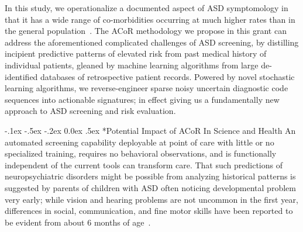 \documentclass[onecolumn, compsoc,11pt]{IEEEtran}
\makeatletter
\renewcommand\paragraph{\@startsection {section}{1}{\z@}%
                                   {-.1ex \@plus -.5ex \@minus -.2ex}%
                                   {0.0ex \@plus.5ex}%
                                   {\fontsize{11}{10}\selectfont\bfseries\itshape\sffamily\color{black}}}
\def\ZERO{ACoR\xspace}
\makeatother
\begin{document}
{\color{Red1}In this study, we operationalize a documented aspect of ASD symptomology in  that it has   a wide range  of co-morbidities occurring at much higher rates than in the general population~\cite{hyman2020identification}.
The \ZERO methodology we propose in this grant can address the aforementioned  complicated  challenges of ASD screening, by distilling incipient predictive patterns of  elevated risk from past medical history of individual  patients, gleaned by machine learning  algorithms from large  de-identified databases of retrospective patient records. Powered by  novel stochastic learning algorithms, we  reverse-engineer sparse noisy uncertain diagnostic code sequences into actionable signatures; in effect giving us  a fundamentally new approach to ASD screening and risk evaluation.}

\paragraph*{Potential  Impact  of  \ZERO In Science and Health}
An automated  screening capability deployable at point of care with little or no specialized training, requires no behavioral observations, and is functionally independent of the current tools  can transform care. That such  predictions  of neuropsychiatric  disorders might be possible  from analyzing historical patterns  is suggested by  parents of children with ASD often noticing developmental problem very early; while vision and hearing problems are not uncommon in the first year,  differences in social, communication, and fine motor skills have been reported to be  evident from about 6 months of age~\cite{pmid21410398,herlihy2015parents,chawarska2013decreased}. 

\end{document}
